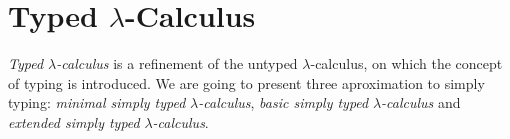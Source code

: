 









\section{Typed $\lambda$-Calculus}
\emph{Typed $\lambda$-calculus} is a refinement of the untyped $\lambda$-calculus, on which the concept of typing is introduced. We are going to present three aproximation to simply typing: \emph{minimal simply typed }$\lambda$\emph{-calculus}, \emph{basic simply typed }$\lambda$\emph{-calculus} and \emph{extended simply typed }$\lambda$\emph{-calculus}. 

